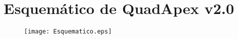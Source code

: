 \chapter{Esquemático de QuadApex v2.0}

\begin{figure}[hbtp]
\centering
\texttt{[image: Esquematico.eps]}
\label{fig:esquematico}
\end{figure}